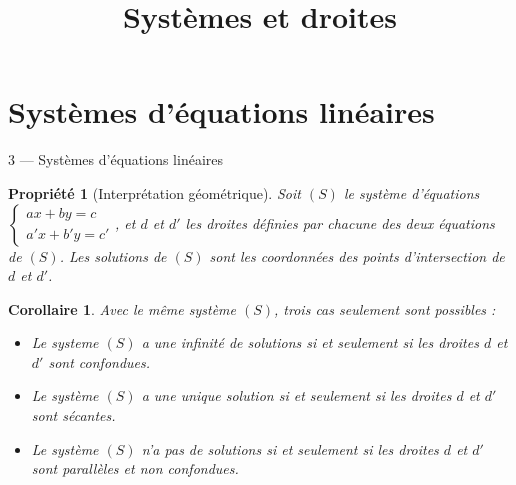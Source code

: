 \documentclass[15pt,smaller,aspectratio=169,xcolor={usenames,dvipsnames}]{beamer}
\title{Systèmes et droites}
\date{}
\newtheorem*{propriete}{Propriété}
\newtheorem*{corollaire}{Corollaire}
\newcommand{\systeme}[2]{\left\{\begin{array}{l}#1\\#2\end{array}\right.}
\begin{document}
\section{Systèmes d'équations linéaires}

\begin{frame}[label=pagesimple]


  \begin{block}{3 --- Systèmes d'équations linéaires}
  \end{block}

\pause

\begin{propriete}[Interprétation géométrique]
  Soit $(S)$ le système d'équations $\systeme{ax+by=c}{a'x+b'y=c'}$, et $d$ et $d'$ les droites définies par chacune des deux équations de $(S)$. Les solutions de $(S)$ sont les coordonnées des points d'intersection de $d$ et $d'$.
\end{propriete}

\pause

\begin{corollaire}Avec le même système $(S)$, trois cas seulement sont possibles :
  \begin{itemize}
    \item Le systeme $(S)$ a une infinité de solutions si et seulement si les droites $d$ et $d'$ sont confondues.
    \item Le système $(S)$ a une unique solution si et seulement si les droites $d$ et $d'$ sont sécantes.
    \item Le système $(S)$ n'a pas de solutions si et seulement si les droites $d$ et $d'$ sont parallèles et non confondues.
  \end{itemize}
\end{corollaire}
\end{frame}
\end{document}
